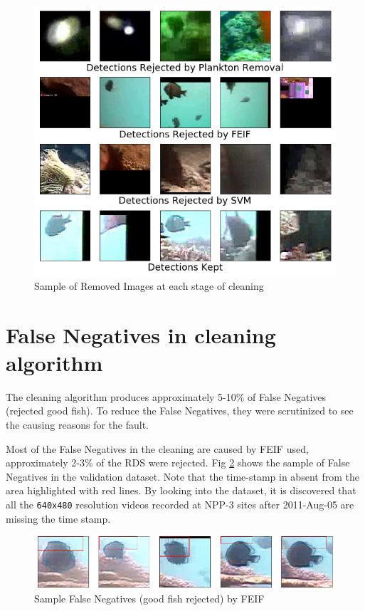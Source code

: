 \documentclass[bsc,logo,twoside,fullspacing,parskip]{infthesis}
\begin{document}
\begin{figure}[h]
    \centering
    \includegraphics[scale=0.45]{graph/finalsample.png}
    \caption{Sample of Removed Images at each stage of cleaning}
    \label{fig:samplestage}
\end{figure}

\section{False Negatives in cleaning algorithm}
\label{sec:falsenegative}
\label{sec:feiffault}
\label{sec:svmfault}

The cleaning algorithm produces approximately 5-10\% of False Negatives (rejected good fish). 
To reduce the False Negatives, they were scrutinized to see the causing reasons for the fault.

Most of the False Negatives in the cleaning are caused by FEIF used, approximately 2-3\% of the RDS were rejected. 
Fig \ref{fig:feiffail} shows the sample of False Negatives in the validation dataset.
Note that the time-stamp in absent from the area highlighted with red lines.
By looking into the dataset, it is discovered that all the {\tt 640x480} resolution videos recorded at NPP-3 sites after 2011-Aug-05 are missing the time stamp.

\begin{figure}[ht]
    \centering
    \includegraphics[scale=0.40]{graph/FEIFfail.png}
    \caption{Sample False Negatives (good fish rejected) by FEIF}
    \label{fig:feiffail}
\end{figure}
\end{document}
